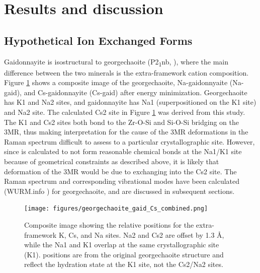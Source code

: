 \documentclass[journal=acsodf,manuscript=article]{achemso}
\begin{document}
\section{Results and discussion}
{\label{sec_results_discussion}} %

\subsection{Hypothetical Ion Exchanged Forms}
{\label{sec_exchange_calculations}} %

Gaidonnayite \cite{Chao1985} is isostructural to georgechaoite\cite{Ghose1985}
(P2\textsubscript{1}nb, ), where the main difference
between the two minerals is the extra-framework cation composition. 
Figure {\ref{fig_george_gaid_combined}} shows a composite image of the
georgechaoite, Na-gaidonnyaite (Na-gaid), and Cs-gaidonnayite (Cs-gaid)
after energy minimization.  Georgechaoite has K1 and Na2 sites, and
gaidonnayite has Na1 (superpositioned on the K1 site) and Na2 site.  The
calculated Cs2 site in Figure {\ref{fig_george_gaid_combined}} was
derived from this study.  The K1 and Cs2 sites both bond to the Zr-O-Si
and Si-O-Si bridging  on the 3MR, thus making interpretation for the
cause of the 3MR deformations in the Raman spectrum difficult to assess
to a particular crystallographic site.  However, since  is calculated
to not form reasonable chemical bonds at the Na1/K1 site because of
geometrical constraints as described above, it is likely that
deformation of the 3MR would be due to  exchanging into the Cs2
site.  The Raman spectrum and corresponding vibrational modes have been
calculated (WURM.info \cite{Caracas_2011,Caracas}) for georgechaoite, and are
discussed in subsequent sections. 

 
\begin{figure}[h!]   %
\begin{center}
\texttt{[image: figures/georgechaoite\_gaid\_Cs\_combined.png]}
\caption{{Composite image showing the relative positions for the extra-framework
K, Cs, and Na sites.  Na2 and Cs2 are offset by 1.3 \AA, while the Na1 and
K1 overlap at the same crystallographic site (K1).  
positions are from the original georgechaoite structure and reflect the
hydration state at the K1 site, not the Cs2/Na2 sites.
{\label{fig_george_gaid_combined}}%
}}
\end{center}
\end{figure} 
\end{document}

